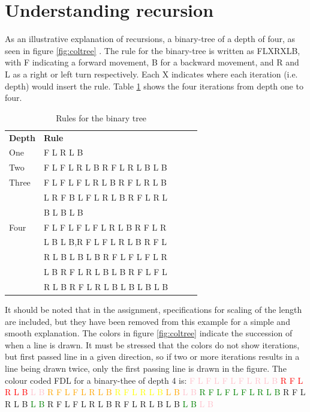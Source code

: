 \documentclass[titlepage]{article}
\newcommand{\pink}{\textcolor{pink}}
\newcommand{\red}{\textcolor{red}}
\newcommand{\orange}{\textcolor{orange}}
\newcommand{\yellow}{\textcolor{yellow}}
\newcommand{\green}{\textcolor{green}}
\newcommand{\lgreen}{\textcolor{lgreen}}
\newcommand{\dblue}{\textcolor{dblue}}
\newcommand{\lblue}{\textcolor{lblue}}
\begin{document}
\section{Understanding recursion}
As an illustrative explanation of recursions, a binary-tree of a depth of four, as seen in figure \ref{fig:coltree}  . The rule for the binary-tree is written as FLXRXLB, with F indicating a forward movement, B for a backward movement, and R and L as a right or left turn respectively. Each X indicates where each iteration (i.e. depth) would insert the rule. Table \ref{table:binary}  shows the four iterations from depth one to four. 
\begin{table}[H]
\centering
\caption{Rules for the binary tree}
\label{table:binary}
\begin{tabular}{lllll}
  \textbf{Depth} & \textbf{Rule}\\
  One   & F L R L B \\
  Two   & F L F L R L B R F L R L B L B\\
  Three &F L F L F L R L B R F L R L B \\
        & L R F B L F L R L B R F L R L  \\
  &B L B L B\\
  Four  & F L F L F L F L R L B R F L R\\
   & L B L B,R F L F L R L B R F L\\
   & R L B L B L B R F L F L F L R\\
   & L B R F L R L B L B R F L F L\\
   & R L B R F L R L B L B L B L B\\
  \end{tabular}
\end{table}
It should be noted that in the assignment, specifications for scaling of the length are included, but they have been removed from this example for a simple and smooth explanation. The colors in figure \ref{fig:coltree} indicate the succession of when a line is drawn. It must be stressed that the colors do not show iterations, but first passed line in a given direction, so if two or more iterations results in a line being drawn twice, only the first passing line is drawn in the figure. The colour coded FDL for a binary-thee of depth 4 is:\newline\newline
\pink{F L F L F L F L R L B} \red{R F L R L B} \pink{L B} \orange{R F L F L R L B} \yellow{R F L R L B} \orange{L B} \pink{L B} \green{R F L F L F L R L B} \lgreen{R F L R L B} \green{L B} \dblue{R F L F L R L B} \lblue{R F L R L B} \dblue{L B} \green{L B} \pink{L B}
\end{document}
